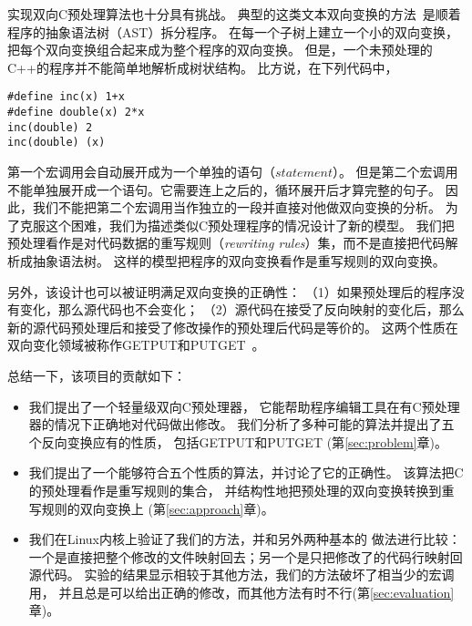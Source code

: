 实现双向C预处理算法也十分具有挑战。
典型的这类文本双向变换的方法~\parencite{MaHNHT07,Voigtlander09bff,MMHT10}是顺着程序的抽象语法树（AST）拆分程序。
在每一个子树上建立一个小的双向变换，把每个双向变换组合起来成为整个程序的双向变换。
但是，一个未预处理的C++的程序并不能简单地解析成树状结构。
比方说，在下列代码中，
\begin{lstlisting}
#define inc(x) 1+x
#define double(x) 2*x
inc(double) 2
inc(double) (x)
\end{lstlisting}
第一个宏调用会自动展开成为一个单独的语句（$statement$）。
但是第二个宏调用不能单独展开成一个语句。它需要连上之后的，循环展开后才算完整的句子。
因此，我们不能把第二个宏调用当作独立的一段并直接对他做双向变换的分析。
为了克服这个困难，我们为描述类似C预处理程序的情况设计了新的模型。
我们把预处理看作是对代码数据的重写规则（\emph{rewriting rules}）集，而不是直接把代码解析成抽象语法树。
这样的模型把程序的双向变换看作是重写规则的双向变换。


另外，该设计也可以被证明满足双向变换的正确性：
（1）如果预处理后的程序没有变化，那么源代码也不会变化；
（2）源代码在接受了反向映射的变化后，那么新的源代码预处理后和接受了修改操作的预处理后代码是等价的。
这两个性质在双向变化领域被称作GETPUT和PUTGET~\parencite{Foster:2007}。

总结一下，该项目的贡献如下：
\begin{itemize}
\item 我们提出了一个轻量级双向C预处理器，
	它能帮助程序编辑工具在有C预处理器的情况下正确地对代码做出修改。
	我们分析了多种可能的算法并提出了五个反向变换应有的性质，
	包括GETPUT和PUTGET
	(第\ref{sec:problem}章)。
\item 我们提出了一个能够符合五个性质的算法，并讨论了它的正确性。
	该算法把C的预处理看作是重写规则的集合，
	并结构性地把预处理的双向变换转换到重写规则的双向变换上
	(第\ref{sec:approach}章)。
\item 我们在Linux内核上验证了我们的方法，并和另外两种基本的
	做法进行比较：一个是直接把整个修改的文件映射回去；另一个是只把修改了的代码行映射回源代码。
	实验的结果显示相较于其他方法，我们的方法破坏了相当少的宏调用，
	并且总是可以给出正确的修改，而其他方法有时不行(第\ref{sec:evaluation}章)。
\end{itemize}

